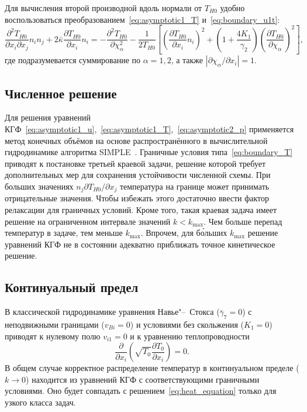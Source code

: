 \documentclass[
aps,%
12pt,%
final,%
notitlepage,%
oneside,%
onecolumn,%
nobibnotes,%
nofootinbib,%
superscriptaddress,%
noshowpacs,%
showkeys,%
tightenlines,%
centertags]%
{revtex4}
\newcommand{\pder}[2][]{\frac{\partial#1}{\partial#2}}
\newcommand{\pderdual}[2][]{\frac{\partial^2#1}{\partial#2^2}}
\newcommand{\pderder}[3][]{\frac{\partial^2#1}{\partial#2\partial#3}}
\newcommand{\Pder}[2][]{\partial#1/\partial#2}
\begin{document}
Для вычисления второй производной вдоль нормали от \(T_{H0}\)
удобно воспользоваться преобразованием~\eqref{eq:asymptotic1_T} и~\eqref{eq:boundary_u1t}:
\begin{equation}\label{eq:Tnn}
    \pderder[T_{H0}]{x_i}{x_j}n_i n_j + 2\bar\kappa\pder[T_{H0}]{x_i}n_i =
    - \pderdual[T_{H0}]{\chi_\alpha} - \frac1{2T_{H0}} \left[
        \left(\pder[T_{H0}]{x_i}n_i\right)^2 +
        \left(1+\frac{4K_1}{\gamma_2}\right) \left(\pder[T_{H0}]{\chi_\alpha}\right)^2
    \right],
\end{equation}
где подразумевается суммирование по \(\alpha=1,2\), а также \(|\Pder[\chi_\alpha]{x_i}| = 1\).

\subsection{Численное решение}

Для решения уравнений КГФ~\eqref{eq:asymptotic1_u},~\eqref{eq:asymptotic1_T},~\eqref{eq:asymptotic2_p}
применяется метод конечных объёмов на основе распространённого в вычислительной гидродинамике алгоритма SIMPLE~\cite{Aoki2007}.
Граничные условия типа~\eqref{eq:boundary_T} приводят к постановке третьей краевой задачи,
решение которой требует дополнительных мер для сохранения устойчивости численной схемы.
При больших значениях \(n_j\Pder[T_{H0}]{x_j}\) температура на границе может принимать отрицательные значения.
Чтобы избежать этого достаточно ввести фактор релаксации для граничных условий.
Кроме того, такая краевая задача имеет решение на ограниченном интервале значений \(k<k_{\max}\).
Чем больше перепад температур в задаче, тем меньше \(k_{\max}\).
Впрочем, для б\'{о}льших \(k_{\max}\) решение уравнений КГФ не в состоянии адекватно приближать
точное кинетическое решение.

\subsection{Континуальный предел}

В классической гидродинамике уравнения Навье"--~Стокса (\(\bar{\gamma}_7=0\))
с неподвижными границами (\(v_{Bi}=0\)) и условиями без скольжения (\(K_1=0\))
приводят к нулевому полю \(v_{i1}=0\) и к уравнению теплопроводности
\begin{equation}\label{eq:heat_equation}
    \pder{x_i}\left(\sqrt{T_0}\pder[T_0]{x_i}\right) = 0.
\end{equation}
В общем случае корректное распределение температур в континуальном пределе (\(k\to0\))
находится из уравнений КГФ с соответствующими граничными условиями.
Оно будет совпадать с решением~\eqref{eq:heat_equation} только для узкого класса задач.
\end{document}
